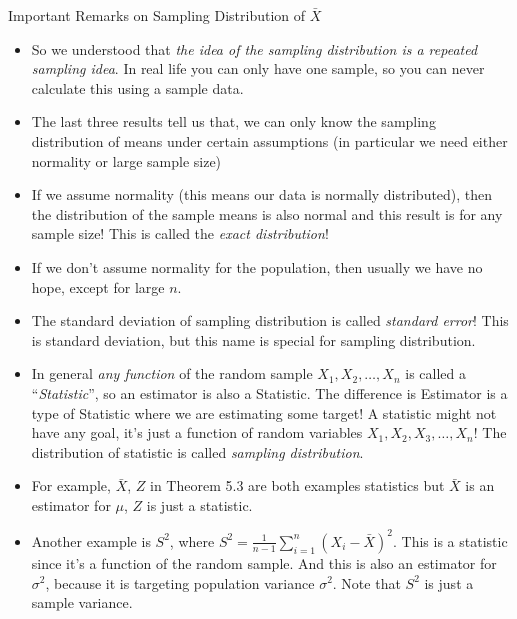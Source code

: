 \documentclass[8pt, usepdftitle=false]{beamer}
\begin{document}


\begin{frame}[allowframebreaks]{Important Remarks on Sampling Distribution of $\bar{X}$}

  
\begin{itemize}
  \item So we understood that \emph{the idea of the sampling distribution is a repeated sampling idea}. In real life you can only have one sample, so you can never calculate this using a sample data.

  \item The last three results tell us that, we can only know the sampling distribution of means under certain assumptions (in particular we need either normality or large sample size)

  \item If we assume normality (this means our data is normally distributed), then the distribution of the sample means is also normal and this result is for any sample size! This is called the \emph{exact distribution}!

  \item If we don't assume normality for the population, then usually we have no hope, except for large $n$.
  
  \item The standard deviation of sampling distribution is called \emph{standard error}! This is standard deviation, but this name is special for sampling distribution.


  \item In general \emph{any function} of the random sample $X_1, X_2, \ldots, X_n$ is called a ``\emph{Statistic}'', so an estimator is also a \alert{Statistic}. The difference is Estimator is a type of Statistic where we are estimating some target! A statistic might not have any goal, it's just a function of random variables $X_1, X_2, X_3, \ldots, X_n$! The distribution of statistic is called \emph{sampling distribution}. 

  \item For example, $\bar{X}$, $Z$ in Theorem 5.3 are both examples statistics but $\bar{X}$ is an estimator for $\mu$, $Z $ is just a statistic.

  \item Another example is $S^2$, where $S^2=\frac{1}{n-1} \sum_{i=1}^n\left(X_i-\bar{X}\right)^2$. This is  a statistic since it's a function of the random sample. And this is also an estimator for $\sigma^2$, because it is targeting population variance $\sigma^2$. Note that $S^2$ is just a sample variance.




\end{itemize}

\end{frame}
\end{document}
